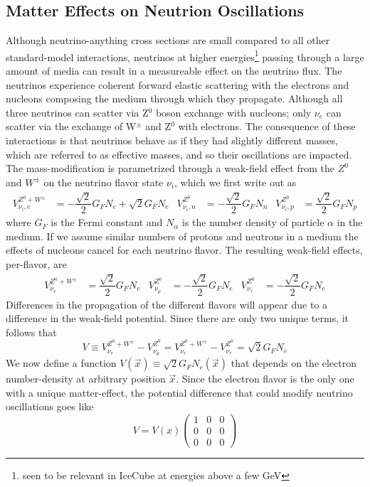 \documentclass[main.tex]{subfiles}
\begin{document}
\subsection{Matter Effects on Neutrion Oscillations}
Although neutrino-anything cross sections are small compared to all other standard-model interactions, neutrinos at higher energies\footnote{seen to be relevant in IceCube at energies above a few GeV} passing through a large amount of media can result in a measureable effect on the neutrino flux. 
The neutrinos experience coherent forward elastic scattering with the electrons and nucleons composing the medium through which they propagate. Although all three neutrinos can scatter via Z$^{0}$ boson exchange with nucleons; only $\nu_{e}$ can scatter via the exchange of W$^{\pm}$ and Z$^{0}$ with electrons. 
The consequence of these interactions is that neutrinos behave as if they had slightly different masses, which are referred to as effective masses, and so their oscillations are impacted.  
The mass-modification is parametrized through a weak-field effect from the $Z^{0}$ and $W^{\pm}$ on the neutrino flavor state $\nu_{i}$, which we first write out as
\begin{align} 
    V_{\nu_{i}, e}^{Z^{0}+W^{\pm}} &= -\dfrac{\sqrt{2}}{2}G_{F} N_{e} + \sqrt{2}G_{F}N_{e}  & V_{\nu_{i}, n}^{Z^{0}} &= -\dfrac{\sqrt{2}}{2}G_{F} N_{n} & V_{\nu_{i}, p}^{Z^{0}} &= \dfrac{\sqrt{2}}{2}G_{F} N_{p}
\end{align}
where $G_{F}$ is the Fermi constant and $N_{\alpha}$ is the number density of particle $\alpha$ in the medium. 
If we assume similar numbers of protons and neutrons in a medium the effects of nucleons cancel for each neutrino flavor. 
The resulting weak-field effects, per-flavor, are
\begin{align} \label{eq:matter_weak}
    V_{\nu_{e}}^{Z^{0}+W^{\pm}} &= \dfrac{\sqrt{2}}{2}G_{F} N_{e}  & V_{\nu_{\mu}}^{Z^{0}} &= -\dfrac{\sqrt{2}}{2}G_{F} N_{e} & V_{\nu_{\tau}}^{Z^{0}} &= -\dfrac{\sqrt{2}}{2}G_{F} N_{e}
\end{align}
Differences in the propagation of the different flavors will appear due to a difference in the weak-field potential. 
Since there are only two unique terms, it follows that 
\begin{equation}
    V \equiv V_{\nu_{e}}^{Z^{0}+W^{\pm}} -  V_{\nu_{\mu}}^{Z^{0}}  =  V_{\nu_{e}}^{Z^{0}+W^{\pm}} -  V_{\nu_{\tau}}^{Z^{0}}   = \sqrt{2} G_{F} N_{e}
\end{equation}
We now define a function $V(\vec{x})\equiv  \sqrt{2} G_{F} N_{e}(\vec{x})$ that depends on the electron number-density at arbitrary position $\vec{x}$.  
Since the electron flavor is the only one with a unique matter-effect, the potential difference that could modify neutrino oscillations goes like 
\begin{equation}
    V = V(x)\left(\begin{array}{ccc} 1&0&0\\0&0&0 \\0&0&0 \end{array}\right) 
\end{equation}
\end{document}
